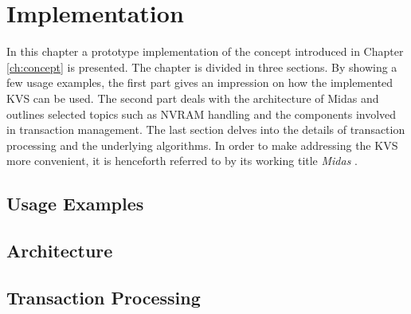 \chapter{Implementation}
\label{ch:impl}

In this chapter a prototype implementation of the concept introduced in Chapter
\ref{ch:concept} is presented. The chapter is divided in three sections. By
showing a few usage examples, the first part gives an impression on how the
implemented \ac{KVS} can be used. The second part deals with the architecture of
Midas and outlines selected topics such as NVRAM handling and the components
involved in transaction management. The last section delves into the details of
transaction processing and the underlying algorithms. In order to make
addressing the \ac{KVS} more convenient, it is henceforth referred to by its
working title \emph{Midas} \footnotemark.


\section{Usage Examples}
\label{ch:impl-usage}


\clearpage

\section{Architecture}
\label{ch:impl-arch}


\section{Transaction Processing}
\label{ch:impl-tx}

